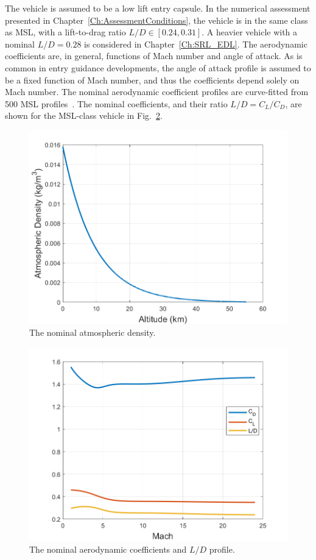 The vehicle is assumed to be a low lift entry capsule. In the numerical assessment presented in Chapter~\ref{Ch:AssessmentConditions}, the vehicle is in the same class as MSL, with a lift-to-drag ratio $L/D\in[0.24, 0.31]$. A heavier vehicle with a nominal $L/D=0.28$ is considered in Chapter~\ref{Ch:SRL_EDL}. The aerodynamic coefficients are, in general, functions of Mach number and angle of attack. As is common in entry guidance developments, the angle of attack profile is assumed to be a fixed function of Mach number, and thus the coefficients depend solely on Mach number. The nominal aerodynamic coefficient profiles are curve-fitted from 500 MSL profiles~\cite{joel_dissertation}. The nominal coefficients, and their ratio $L/D = C_L/C_D$, are shown for the MSL-class vehicle in Fig.~\ref{Fig:AeroCoeffNominal}.
\begin{figure}[h!]
	\centering
	\includegraphics[width=1\textwidth]{Images/DensityNominal}
	\caption{The nominal atmospheric density.}
	\label{Fig:DensityNominal}
\end{figure}
\begin{figure}[h!]
	\centering
	\includegraphics[width=1\textwidth]{Images/CoeffNominal}
	\caption{The nominal aerodynamic coefficients and $L/D$ profile.}
	\label{Fig:AeroCoeffNominal}
\end{figure}

